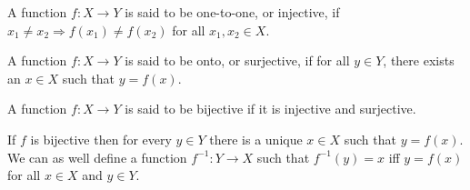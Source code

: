 \begin{defn}\label{c2s3d4}
A function $f: X \rightarrow Y$ is said to be one-to-one, or injective, 
if $x_1 \ne x_2 \Rightarrow f(x_1) \ne f(x_2)$ for all $x_1, x_2 \in X$.
\end{defn}

\begin{defn}\label{c2s3d5}
A function $f: X \rightarrow Y$ is said to be onto, or surjective, if
for all $y \in Y$, there exists an $x \in X$ such that $y = f(x)$.
\end{defn}

\begin{defn}\label{c2s3d6}
A function $f: X \rightarrow Y$ is said to be bijective if it is injective
and surjective.
\end{defn}

If $f$ is bijective then for every $y \in Y$ there is a unique $x \in X$
such that $y = f(x)$. We can as well define a function $f^{-1}: Y 
\rightarrow X$ such that $f^{-1}(y) = x$ iff $y = f(x)$ for all $x \in X$
and $y \in Y$.

